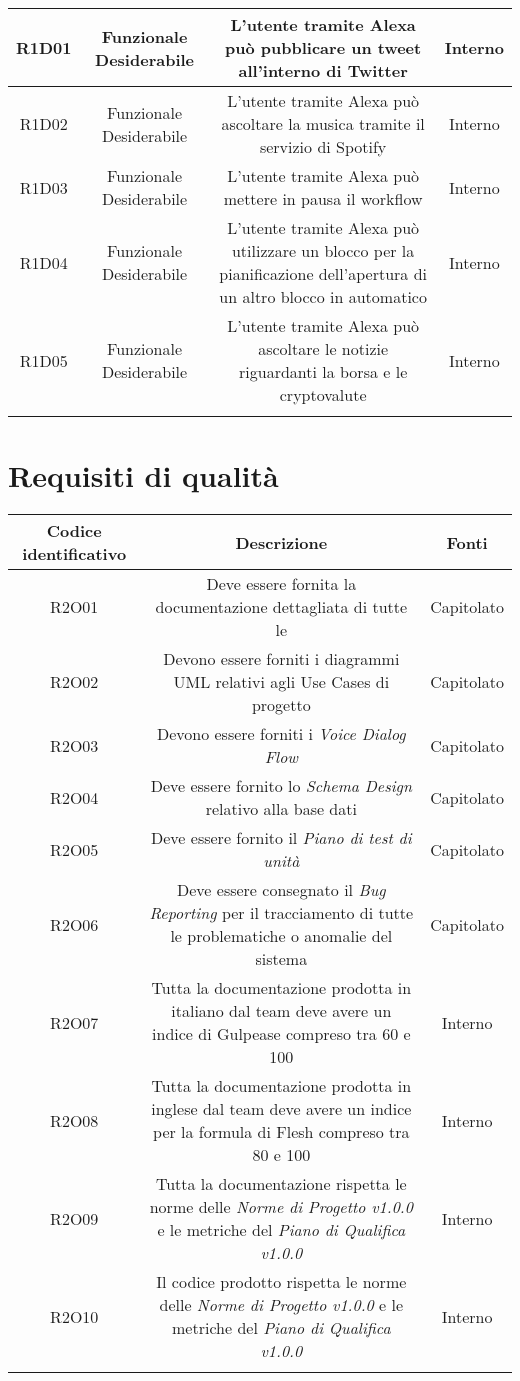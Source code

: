 \begin{tabularx}{\textwidth}{|C|C|C|C|}
	R1D01&Funzionale Desiderabile  &L'utente tramite Alexa può pubblicare un tweet all'interno di Twitter &Interno \\
	\hline
	R1D02&Funzionale Desiderabile  &L'utente tramite Alexa può ascoltare la musica tramite il servizio di Spotify &Interno \\
	\hline
	R1D03&Funzionale Desiderabile  &L'utente tramite Alexa può mettere in pausa il workflow &Interno \\
	\hline
	R1D04&Funzionale Desiderabile  &L'utente tramite Alexa può utilizzare un blocco per la pianificazione dell'apertura di un altro blocco in automatico &Interno \\
	\hline
	R1D05&Funzionale Desiderabile  &L'utente tramite Alexa può ascoltare le notizie riguardanti la borsa e le cryptovalute &Interno \\
	\hline
	\caption{Tabella requisiti funzionali}
\end{tabularx}


\section{Requisiti di qualità}
\begin{tabularx}{\textwidth}{|C|C|C|}
	\hline
	\textbf{Codice identificativo} & \textbf{Descrizione} & \textbf{Fonti} \\
	\hline
	\endhead
	R2O01 & Deve essere fornita la documentazione dettagliata di tutte le  & Capitolato\\
	\hline
	R2O02 & Devono essere forniti i diagrammi UML relativi agli Use Cases di progetto  & Capitolato\\
	\hline
	R2O03 & Devono essere forniti i \textit{Voice Dialog Flow} & Capitolato\\
	\hline
	R2O04 & Deve essere fornito lo \textit{Schema Design} relativo alla base dati  & Capitolato\\
	\hline
	R2O05 & Deve essere fornito il \textit{Piano di test di unità} & Capitolato\\
	\hline
	R2O06 & Deve essere consegnato il \textit{Bug Reporting} per il tracciamento di
	tutte le problematiche o anomalie del sistema & Capitolato\\
	\hline
	R2O07 & Tutta la documentazione prodotta in italiano dal team deve avere
	un indice di Gulpease compreso tra 60 e 100 & Interno\\
	\hline
	R2O08 & Tutta la documentazione prodotta in inglese dal team deve avere
	un indice per la formula di Flesh compreso tra 80 e 100 & Interno\\
	\hline
	R2O09 & Tutta la documentazione rispetta le norme delle \textit{Norme di Progetto v1.0.0} e le metriche del \textit{Piano di Qualifica v1.0.0}& Interno\\
	\hline
	R2O10 & Il codice prodotto rispetta le norme delle \textit{Norme di Progetto v1.0.0} e le metriche del \textit{Piano di Qualifica v1.0.0}& Interno\\
	\hline
    \caption{Tabella requisiti di qualità}
\end{tabularx}

